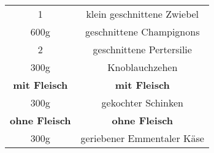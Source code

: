 \begin{tabular}{ c  | c}
	1 & klein geschnittene Zwiebel\\
	600g & geschnittene Champignons \\
	2 & geschnittene Pertersilie \\
	300g & Knoblauchzehen \\
	\textbf{mit Fleisch} & \textbf{mit Fleisch}\\
	300g & gekochter Schinken \\
	\textbf{ohne Fleisch} & \textbf{ohne Fleisch}\\
	300g & geriebener Emmentaler Käse \\
\end{tabular}
